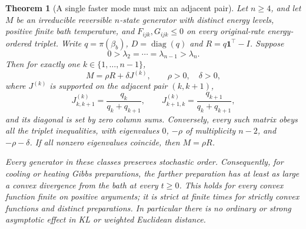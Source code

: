 \documentclass[11pt]{article}
\newtheorem{theorem}{Theorem}
\begin{document}
\begin{theorem}[A single faster mode must mix an adjacent pair]
\label{thm:tripletdegenerate}
Let $n\geq4$, and let $M$ be an irreducible reversible $n$-state generator
with distinct energy levels, positive finite bath temperature, and
$F_{ijk},G_{ijk}\leq0$ on every original-rate energy-ordered triplet.
Write $q=\pi(\beta_b)$, $D=\operatorname{diag}(q)$ and
$R=q\mathbf1^\top-I$. Suppose
\[
0>\lambda_2=\cdots=\lambda_{n-1}>\lambda_n.
\]
Then for exactly one $k\in\{1,\ldots,n-1\}$,
\[
M=\rho R+\delta J^{(k)},\qquad \rho>0,\quad\delta>0,
\]
where $J^{(k)}$ is supported on the adjacent pair $(k,k+1)$,
\[
J^{(k)}_{k,k+1}=\frac{q_k}{q_k+q_{k+1}},\qquad
J^{(k)}_{k+1,k}=\frac{q_{k+1}}{q_k+q_{k+1}},
\]
and its diagonal is set by zero column sums. Conversely, every such
matrix obeys all the triplet inequalities, with eigenvalues $0$,
$-\rho$ of multiplicity $n-2$, and $-\rho-\delta$.
If all nonzero eigenvalues coincide, then $M=\rho R$.

Every generator in these classes preserves stochastic order.
Consequently, for cooling or heating Gibbs preparations, the farther
preparation has at least as large a convex divergence from the bath at
every $t\geq0$. This holds for every convex function finite on positive
arguments; it is strict at finite times for strictly convex functions
and distinct preparations. In particular there is no ordinary or strong
asymptotic effect in KL or weighted Euclidean distance.
\end{theorem}
\end{document}

